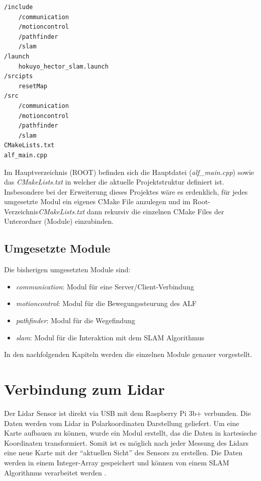 \vspace{0.5cm}
\begin{lstlisting}
/include
	/communication
	/motioncontrol
	/pathfinder
	/slam
/launch
	hokuyo_hector_slam.launch
/srcipts
	resetMap
/src
	/communication
	/motioncontrol
	/pathfinder
	/slam
CMakeLists.txt
alf_main.cpp

\end{lstlisting}
\vspace{-0.5cm}

Im Hauptverzeichnis (ROOT) befinden sich die Hauptdatei (\textit{alf\_main.cpp}) sowie das \textit{CMakeLists.txt} in welcher die aktuelle Projektstruktur definiert ist. Insbesondere bei der Erweiterung dieses Projektes wäre es erdenklich, für jedes umgesetzte Modul ein eigenes CMake File anzulegen und im Root-Verzeichnis\textit{CMakeLists.txt} dann rekursiv die einzelnen CMake Files der Unterordner (Module) einzubinden. 


\subsection*{Umgesetzte Module}

Die bisherigen umgesetzten Module sind: 

\begin{itemize}
\item \textit{communication}: Modul für eine Server/Client-Verbindung
\item \textit{motioncontrol}: Modul für die Bewegungssteurung des ALF
\item \textit{pathfinder}: Modul für die Wegefindung 
\item \textit{slam}: Modul für die Interaktion mit dem SLAM Algorithmus
\end{itemize}

In den nachfolgenden Kapiteln werden die einzelnen Module genauer vorgestellt. 












\section{Verbindung zum Lidar}

Der Lidar Sensor ist direkt via USB mit dem Raspberry Pi 3b+ verbunden. Die Daten werden vom Lidar in Polarkoordinaten Darstellung geliefert. Um eine Karte aufbauen zu können, wurde ein Modul erstellt, das die Daten in kartesische Koordinaten transformiert. Somit ist es möglich nach jeder Messung des Lidars eine neue Karte mit der "`aktuellen Sicht"' des Sensors zu erstellen. Die Daten werden in einem Integer-Array gespeichert und können von einem SLAM Algorithmus verarbeitet werden . 

